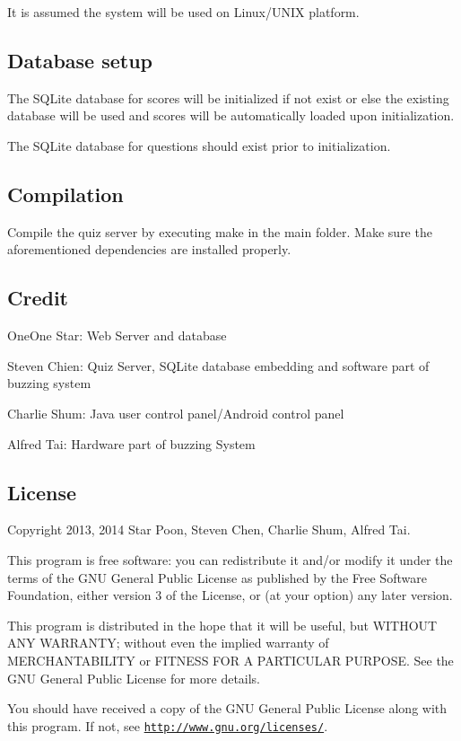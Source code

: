 It is assumed the system will be used on Linux/\+U\+N\+I\+X platform.

\subsection*{Database setup}

The S\+Q\+Lite database for scores will be initialized if not exist or else the existing database will be used and scores will be automatically loaded upon initialization.

The S\+Q\+Lite database for questions should exist prior to initialization.

\subsection*{Compilation}

Compile the quiz server by executing make in the main folder. Make sure the aforementioned dependencies are installed properly.

\subsection*{Credit}


\begin{DoxyItemize}
\item One\+One Star\+: Web Server and database
\item Steven Chien\+: Quiz Server, S\+Q\+Lite database embedding and software part of buzzing system
\item Charlie Shum\+: Java user control panel/\+Android control panel
\item Alfred Tai\+: Hardware part of buzzing System
\end{DoxyItemize}

\subsection*{License}

Copyright 2013, 2014 Star Poon, Steven Chen, Charlie Shum, Alfred Tai.

This program is free software\+: you can redistribute it and/or modify it under the terms of the G\+N\+U General Public License as published by the Free Software Foundation, either version 3 of the License, or (at your option) any later version.

This program is distributed in the hope that it will be useful, but W\+I\+T\+H\+O\+U\+T A\+N\+Y W\+A\+R\+R\+A\+N\+T\+Y; without even the implied warranty of M\+E\+R\+C\+H\+A\+N\+T\+A\+B\+I\+L\+I\+T\+Y or F\+I\+T\+N\+E\+S\+S F\+O\+R A P\+A\+R\+T\+I\+C\+U\+L\+A\+R P\+U\+R\+P\+O\+S\+E. See the G\+N\+U General Public License for more details.

You should have received a copy of the G\+N\+U General Public License along with this program. If not, see \href{http://www.gnu.org/licenses/}{\tt http\+://www.\+gnu.\+org/licenses/}. 